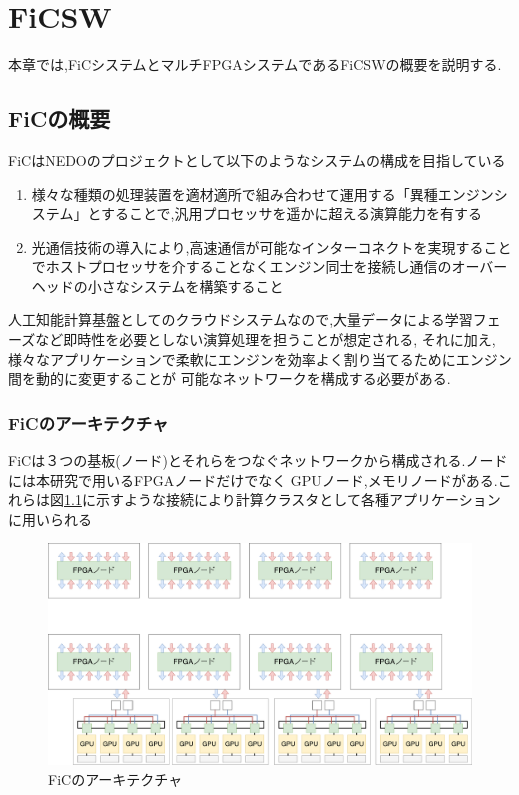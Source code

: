 \chapter{FiCSW}
{
  \label{chap:ficsw}
  本章では,FiCシステムとマルチFPGAシステムであるFiCSWの概要を説明する.
  
  \section{FiCの概要}
  \label{sec:about_fic}
  FiCはNEDOのプロジェクトとして以下のようなシステムの構成を目指している
  
  \begin{enumerate}
    \item 様々な種類の処理装置を適材適所で組み合わせて運用する「異種エンジンシステム」とすることで,汎用プロセッサを遥かに超える演算能力を有する
    \item 光通信技術の導入により,高速通信が可能なインターコネクトを実現することでホストプロセッサを介することなくエンジン同士を接続し通信のオーバーヘッドの小さなシステムを構築すること
  \end{enumerate}
  
  人工知能計算基盤としてのクラウドシステムなので,大量データによる学習フェーズなど即時性を必要としない演算処理を担うことが想定される,
  それに加え,様々なアプリケーションで柔軟にエンジンを効率よく割り当てるためにエンジン間を動的に変更することが
  可能なネットワークを構成する必要がある.
  
  \subsection{FiCのアーキテクチャ}
  \label{sec:arch_fic}
  FiCは３つの基板(ノード)とそれらをつなぐネットワークから構成される.ノードには本研究で用いるFPGAノードだけでなく
  GPUノード,メモリノードがある.これらは図\ref{fig:arch_fic}に示すような接続により計算クラスタとして各種アプリケーションに用いられる
  
  \begin{figure}[h]
    \centering
    \includegraphics[width=12cm]{./chap3/fig/arch_fic.pdf}
    \caption{FiCのアーキテクチャ}
    \label{fig:arch_fic}
  \end{figure}
  
}

